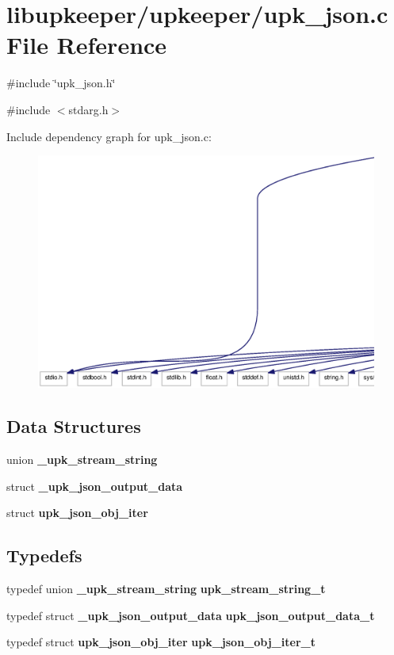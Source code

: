 \section{libupkeeper/upkeeper/upk\_\-json.c File Reference}
\label{upk__json_8c}
{\ttfamily \#include \char`\"{}upk\_\-json.h\char`\"{}}\par
{\ttfamily \#include $<$stdarg.h$>$}\par
Include dependency graph for upk\_\-json.c:\nopagebreak
\begin{figure}[H]
\begin{center}
\leavevmode
\includegraphics[width=400pt]{upk__json_8c__incl}
\end{center}
\end{figure}
\subsection*{Data Structures}
\begin{DoxyCompactItemize}
\item 
union {\bf \_\-upk\_\-stream\_\-string}
\item 
struct {\bf \_\-upk\_\-json\_\-output\_\-data}
\item 
struct {\bf upk\_\-json\_\-obj\_\-iter}
\end{DoxyCompactItemize}
\subsection*{Typedefs}
\begin{DoxyCompactItemize}
\item 
typedef union {\bf \_\-upk\_\-stream\_\-string} {\bf upk\_\-stream\_\-string\_\-t}
\item 
typedef struct {\bf \_\-upk\_\-json\_\-output\_\-data} {\bf upk\_\-json\_\-output\_\-data\_\-t}
\item 
typedef struct {\bf upk\_\-json\_\-obj\_\-iter} {\bf upk\_\-json\_\-obj\_\-iter\_\-t}
\end{DoxyCompactItemize}
